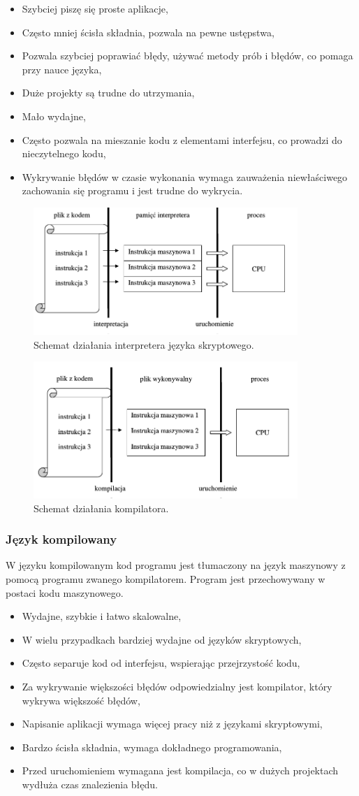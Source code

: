 \documentclass{mwart}
\newcommand*\tick{\item[\Checkmark]}
\newcommand*\fail{\item[\XSolidBrush]}
\begin{document}
\begin{itemize}
    \tick Szybciej piszę się proste aplikacje,
    \tick Często mniej ścisła składnia, pozwala na pewne ustępstwa,
    \tick Pozwala szybciej poprawiać błędy, używać metody prób i błędów,
    co pomaga przy nauce języka,
    \fail Duże projekty są trudne do utrzymania,
    \fail Mało wydajne,
    \fail Często pozwala na mieszanie kodu z elementami interfejsu, co prowadzi 
    do nieczytelnego kodu,
    \fail Wykrywanie błędów w czasie wykonania wymaga zauważenia niewłaściwego zachowania się
    programu i jest trudne do wykrycia.
\end{itemize}
\begin{center}
  \begin{figure}
    \includegraphics[width=10cm]{diag1}
    \caption{Schemat działania interpretera języka skryptowego.}
  \end{figure}
\end{center}
\begin{center}
  \begin{figure}
    \includegraphics[width=10cm]{diag2}
    \caption{Schemat działania kompilatora.}
  \end{figure}
\end{center}
\subsubsection{Język kompilowany}
W języku kompilowanym kod programu jest tłumaczony na język maszynowy z pomocą programu zwanego kompilatorem. Program jest przechowywany w postaci kodu maszynowego.
\begin{itemize}
    \tick Wydajne, szybkie i łatwo skalowalne,
    \tick W wielu przypadkach bardziej wydajne od języków skryptowych,
    \tick Często separuje kod od interfejsu, wspierając przejrzystość kodu,
    \tick Za wykrywanie większości błędów odpowiedzialny jest kompilator, który wykrywa
    większość błędów,
    \fail Napisanie aplikacji wymaga więcej pracy niż z językami skryptowymi,
    \fail Bardzo ścisła składnia, wymaga dokładnego programowania,
    \fail Przed uruchomieniem wymagana jest kompilacja, co w dużych projektach wydłuża czas
    znalezienia błędu.
\end{itemize}
\end{document}
